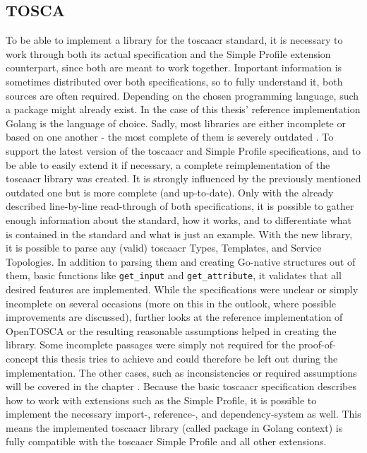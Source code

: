 \subsection{TOSCA}
To be able to implement a library for the \gls{toscaacr} standard, it is necessary to work through both its actual specification and the Simple Profile extension counterpart, since both are meant to work together. Important information is sometimes distributed over both specifications, so to fully understand it, both sources are often required.
\newline
Depending on the chosen programming language, such a package might already exist. In the case of this thesis' reference implementation Golang is the language of choice. Sadly, most libraries are either incomplete or based on one another - the most complete of them is severely outdated \cite{github_toscalib_forks}.
\newline
To support the latest version of the \gls{toscaacr} and Simple Profile specifications, and to be able to easily extend it if necessary, a complete reimplementation of the \gls{toscaacr} library was created. It is strongly influenced by the previously mentioned outdated one but is more complete (and up-to-date). Only with the already described line-by-line read-through of both specifications, it is possible to gather enough information about the standard, how it works, and to differentiate what is contained in the standard and what is just an example.
\newline
With the new library, it is possible to parse any (valid) \gls{toscaacr} Types, Templates, and Service Topologies.
In addition to parsing them and creating Go-native structures out of them, basic functions like \texttt{get_input} and \texttt{get_attribute}, it validates that all desired features are implemented. While the specifications were unclear or simply incomplete on several occasions (more on this in the outlook, where possible improvements are discussed), further looks at the reference implementation of OpenTOSCA or the resulting reasonable assumptions helped in creating the library. Some incomplete passages were simply not required for the proof-of-concept this thesis tries to achieve and could therefore be left out during the implementation. The other cases, such as inconsistencies or required assumptions will be covered in the chapter . %
\newline
Because the basic \gls{toscaacr} specification describes how to work with extensions such as the Simple Profile, it is possible to implement the necessary import-, reference-, and dependency-system as well. This means the implemented \gls{toscaacr} library (called package in Golang context) is fully compatible with the \gls{toscaacr} Simple Profile and all other extensions.
